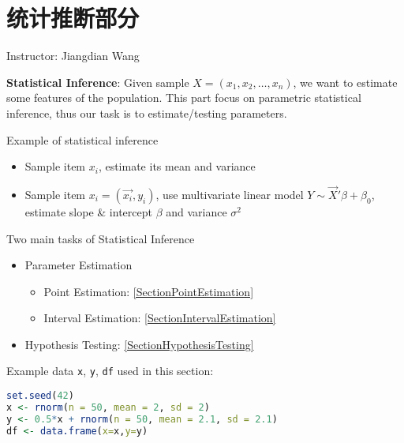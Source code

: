\chapter{统计推断部分}
\begin{center}
    Instructor: Jiangdian Wang
\end{center}

    \textbf{Statistical Inference}: Given sample $ X=(x_{1},x_{2},\ldots,x_{n})  $, we want to estimate some features of the population. This part focus on parametric statistical inference, thus our task is to estimate/testing parameters.

\begin{point}
    Example of statistical inference
\end{point}

\begin{itemize}[topsep=2pt,itemsep=0pt]
    \item Sample item $ x_i $, estimate its mean and variance
    \item Sample item $ x_i=(\vec{x_i},y_i) $, use multivariate linear model $ Y\sim \vec{X}'\beta +\beta _0 $, estimate slope \& intercept $ \beta  $ and variance $ \sigma ^2 $
\end{itemize}

        
\begin{point}
    Two main tasks of Statistical Inference
\end{point}

    \begin{itemize}[topsep= 2 pt,itemsep= 0 pt,parsep= 0 pt]
        \item Parameter Estimation
        \begin{itemize}
            \item Point Estimation: {\autoref{SectionPointEstimation}}
            \item Interval Estimation: {\autoref{SectionIntervalEstimation}}
        \end{itemize}
        \item Hypothesis Testing: {\autoref{SectionHypothesisTesting}}
    \end{itemize}

\begin{rcode}
    Example data \lstinline|x|, \lstinline|y|, \lstinline|df| used in this section:
\begin{lstlisting}[language=R]
set.seed(42)
x <- rnorm(n = 50, mean = 2, sd = 2)
y <- 0.5*x + rnorm(n = 50, mean = 2.1, sd = 2.1)
df <- data.frame(x=x,y=y)
\end{lstlisting}
\end{rcode}



